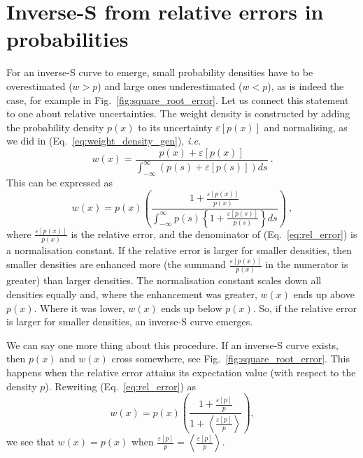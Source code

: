 \documentclass[12pt,letter,timesnewroman]{article}
\newcommand{\ave}[1]{\left\langle#1 \right\rangle}
\newcommand{\elabel}[1]{\label{eq:#1}}
\newcommand{\eref}[1]{(Eq.~\ref{eq:#1})}
\newcommand{\flabel}[1]{\label{fig:#1}}
\newcommand{\fref}[1]{Fig.~\ref{fig:#1}}
\newcommand{\seclabel}[1]{\label{sec:#1}}
\newcommand{\ie}{\textit{i.e.}\ }
\newcommand{\be}{\begin{equation}}
\newcommand{\ee}{\end{equation}}
\newcommand{\err}[1]{\varepsilon\left[#1\right]}
\begin{document}
\begin{figure}[!htb]
{%
}
\flabel{mapping_pdfs_cdfs_Sshape}
\end{figure}

\newpage
\section{Inverse-S from relative errors in probabilities}
\seclabel{relative_errors}

For an inverse-S curve to emerge, small probability densities have to be overestimated ($w>p$) and large ones underestimated ($w<p$), as is indeed the case, for example in \fref{square_root_error}. Let us connect this statement to one about relative uncertainties. The weight density is constructed by adding the probability density $p(x)$ to its uncertainty $\err{p(x)}$ and normalising, as we did in \eref{weight_density_gen}, \ie
\be
w(x)=\frac{p(x)+\err{p(x)}}{\int_{-\infty}^{\infty} \left( p(s)+\err{p(s)} \right) ds}~.
\ee
This can be expressed as
\be
w(x)=p(x) \left(\frac{1+\frac{\err{p(x)}}{p(x)}}{\int_{-\infty}^{\infty} p(s)\left\{1+\frac{\err{p(s)}}{p(s)}\right\} ds}\right)~,
\elabel{rel_error}
\ee
where $\frac{\err{p(x)}}{p(x)}$ is the relative error, and the denominator of \eref{rel_error} is a normalisation constant. If the relative error is larger for smaller densities, then smaller densities are enhanced more (the summand $\frac{\err{p(x)}}{p(x)}$ in the numerator is greater) than larger densities. The normalisation constant scales down all densities equally and, where the enhancement was greater, $w(x)$ ends up above $p(x)$. Where it was lower, $w(x)$ ends up below $p(x)$. So, if the relative error is larger for smaller densities, an inverse-S curve emerges.

We can say one more thing about this procedure. If an inverse-S curve exists, then $p(x)$ and $w(x)$ cross somewhere, see \fref{square_root_error}. This happens when the relative error attains its expectation value (with respect to the density $p$). Rewriting \eref{rel_error} as
\be
w(x)=p(x) \left(\frac{1+\frac{\err{p}}{p}}{1+\ave{\frac{\err{p}}{p}}}\right),
\ee
we see that $w(x)=p(x)$ when $\frac{\err{p}}{p}=\ave{\frac{\err{p}}{p}}.$
\end{document}
